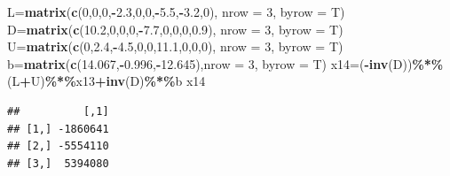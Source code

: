 \documentclass[
]{article}
\newenvironment{Shaded}{\begin{snugshade}}{\end{snugshade}}
\newcommand{\AttributeTok}[1]{\textcolor[rgb]{0.13,0.29,0.53}{#1}}
\newcommand{\DecValTok}[1]{\textcolor[rgb]{0.00,0.00,0.81}{#1}}
\newcommand{\FloatTok}[1]{\textcolor[rgb]{0.00,0.00,0.81}{#1}}
\newcommand{\FunctionTok}[1]{\textcolor[rgb]{0.13,0.29,0.53}{\textbf{#1}}}
\newcommand{\NormalTok}[1]{#1}
\newcommand{\OtherTok}[1]{\textcolor[rgb]{0.56,0.35,0.01}{#1}}
\newcommand{\SpecialCharTok}[1]{\textcolor[rgb]{0.81,0.36,0.00}{\textbf{#1}}}
\begin{document}
\begin{Shaded}
\begin{Highlighting}[]
\NormalTok{  L}\OtherTok{=}\FunctionTok{matrix}\NormalTok{(}\FunctionTok{c}\NormalTok{(}\DecValTok{0}\NormalTok{,}\DecValTok{0}\NormalTok{,}\DecValTok{0}\NormalTok{,}\SpecialCharTok{{-}}\FloatTok{2.3}\NormalTok{,}\DecValTok{0}\NormalTok{,}\DecValTok{0}\NormalTok{,}\SpecialCharTok{{-}}\FloatTok{5.5}\NormalTok{,}\SpecialCharTok{{-}}\FloatTok{3.2}\NormalTok{,}\DecValTok{0}\NormalTok{), }\AttributeTok{nrow =} \DecValTok{3}\NormalTok{, }\AttributeTok{byrow =}\NormalTok{ T)}
\NormalTok{  D}\OtherTok{=}\FunctionTok{matrix}\NormalTok{(}\FunctionTok{c}\NormalTok{(}\FloatTok{10.2}\NormalTok{,}\DecValTok{0}\NormalTok{,}\DecValTok{0}\NormalTok{,}\DecValTok{0}\NormalTok{,}\SpecialCharTok{{-}}\FloatTok{7.7}\NormalTok{,}\DecValTok{0}\NormalTok{,}\DecValTok{0}\NormalTok{,}\DecValTok{0}\NormalTok{,}\FloatTok{0.9}\NormalTok{), }\AttributeTok{nrow =} \DecValTok{3}\NormalTok{, }\AttributeTok{byrow =}\NormalTok{ T)}
\NormalTok{  U}\OtherTok{=}\FunctionTok{matrix}\NormalTok{(}\FunctionTok{c}\NormalTok{(}\DecValTok{0}\NormalTok{,}\FloatTok{2.4}\NormalTok{,}\SpecialCharTok{{-}}\FloatTok{4.5}\NormalTok{,}\DecValTok{0}\NormalTok{,}\DecValTok{0}\NormalTok{,}\FloatTok{11.1}\NormalTok{,}\DecValTok{0}\NormalTok{,}\DecValTok{0}\NormalTok{,}\DecValTok{0}\NormalTok{), }\AttributeTok{nrow =} \DecValTok{3}\NormalTok{, }\AttributeTok{byrow =}\NormalTok{ T)}
\NormalTok{  b}\OtherTok{=}\FunctionTok{matrix}\NormalTok{(}\FunctionTok{c}\NormalTok{(}\FloatTok{14.067}\NormalTok{,}\SpecialCharTok{{-}}\FloatTok{0.996}\NormalTok{,}\SpecialCharTok{{-}}\FloatTok{12.645}\NormalTok{),}\AttributeTok{nrow =} \DecValTok{3}\NormalTok{, }\AttributeTok{byrow =}\NormalTok{ T)}
\NormalTok{  x14}\OtherTok{=}\NormalTok{(}\SpecialCharTok{{-}}\FunctionTok{inv}\NormalTok{(D))}\SpecialCharTok{\%*\%}\NormalTok{(L}\SpecialCharTok{+}\NormalTok{U)}\SpecialCharTok{\%*\%}\NormalTok{x13}\SpecialCharTok{+}\FunctionTok{inv}\NormalTok{(D)}\SpecialCharTok{\%*\%}\NormalTok{b}
\NormalTok{  x14}
\end{Highlighting}
\end{Shaded}

\begin{verbatim}
##          [,1]
## [1,] -1860641
## [2,] -5554110
## [3,]  5394080
\end{verbatim}
\end{document}
